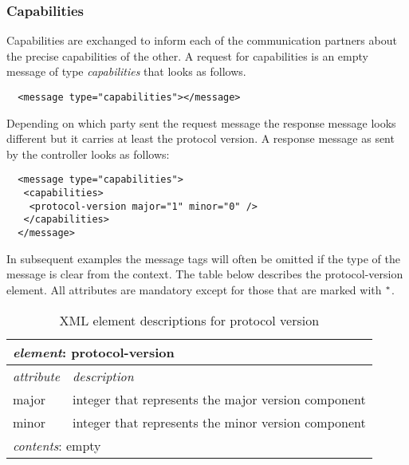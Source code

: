 \documentclass{article}
\begin{document}

  \subsubsection{Capabilities}

   Capabilities are exchanged to inform each of the communication partners
   about the precise capabilities of the other. A request for capabilities
   is an empty message of type \textit{capabilities} that looks as follows.

   \small \begin{verbatim}
  <message type="capabilities"></message>\end{verbatim}
  \normalsize

   \noindent Depending on which party sent the request message the response
   message looks different but it carries at least the protocol version. A
   response message as sent by the controller looks as follows:

   \small \begin{verbatim}
  <message type="capabilities">
   <capabilities>
    <protocol-version major="1" minor="0" />
   </capabilities>
  </message>\end{verbatim}
  \normalsize

   \noindent In subsequent examples the message tags will often be omitted if
   the type of the message is clear from the context. The table below describes
   the protocol-version element. All attributes are mandatory except for those
   that are marked with $\sp{*}$.

   \begin{table}[H]
    \begin{center}
    \begin{tabular}{|l|l|}
      \hline
       \multicolumn{2}{|l|}{\textit{element}: protocol-version} \\
      \hline \hline
       \textit{attribute} & \textit{description} \\
      \hline
       major      & integer that represents the major version component \\
       minor      & integer that represents the minor version component \\
      \hline
       \multicolumn{2}{|l|}{\textit{contents}: empty} \\
      \hline
    \end{tabular}
    \end{center}
    \caption{XML element descriptions for protocol version}
   \end{table}
\end{document}

